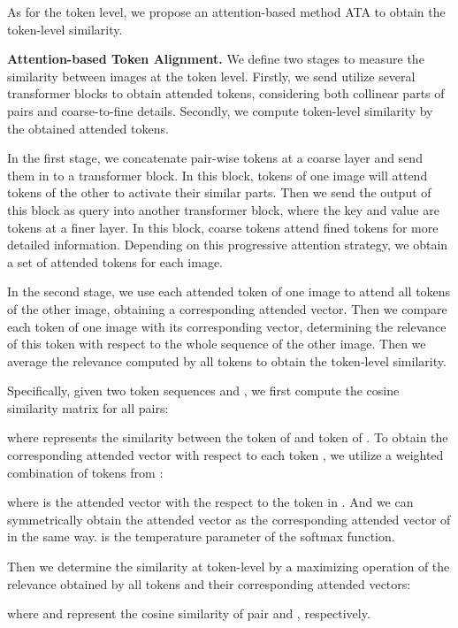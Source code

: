 \documentclass[10pt,twocolumn,letterpaper]{article}
\begin{document}
As for the token level, we propose an attention-based method ATA to obtain the token-level similarity. 
\par \textbf{Attention-based Token Alignment.}
We define two stages to measure the similarity between images at the token level. Firstly, we send utilize several transformer blocks to obtain attended tokens, considering both collinear parts of pairs and coarse-to-fine details.  Secondly, we compute token-level similarity by the obtained attended tokens. 
\par In the first stage, we concatenate pair-wise tokens at a coarse layer and send them in to a transformer block. In this block, tokens of one image will attend tokens of the other to activate their similar parts. Then we send the output of this block as query into another transformer block, where the key and value are tokens at a finer layer. In this block, coarse tokens attend fined tokens for more detailed information. Depending on this progressive attention strategy, we obtain a set of attended tokens for each image. 
\par In the second stage, we use each attended token of one image to attend all tokens of the other image, obtaining a corresponding attended vector. Then we compare each token of one image with its corresponding vector, determining the relevance of this token with respect to the whole sequence of the other image. Then we average the relevance computed by all tokens to obtain the token-level similarity.
\par Specifically, given two token sequences  and , we first compute the cosine similarity matrix for all pairs:

where  represents the similarity between the  token of  and  token of . To obtain the corresponding attended vector with respect to each token , we utilize a weighted combination of tokens from :

where  is the attended vector with the respect to the  token in . And we can symmetrically obtain the attended vector  as the corresponding attended vector of  in the same way.  is the temperature parameter of the softmax function. 
\par Then we determine the similarity at token-level by a maximizing operation of the relevance obtained by all tokens and their corresponding attended vectors:  

where  and  represent the cosine similarity of pair  and , respectively. 
\end{document}
